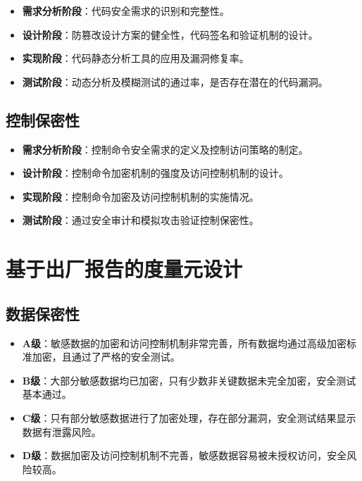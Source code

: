 \begin{itemize}
    \item \textbf{需求分析阶段}：代码安全需求的识别和完整性。\cite{chowdhury2008security}
    \item \textbf{设计阶段}：防篡改设计方案的健全性，代码签名和验证机制的设计。
    \item \textbf{实现阶段}：代码静态分析工具的应用及漏洞修复率。
    \item \textbf{测试阶段}：动态分析及模糊测试的通过率，是否存在潜在的代码漏洞。
\end{itemize}

\subsection{控制保密性}

\begin{itemize}
    \item \textbf{需求分析阶段}：控制命令安全需求的定义及控制访问策略的制定。
    \item \textbf{设计阶段}：控制命令加密机制的强度及访问控制机制的设计。
    \item \textbf{实现阶段}：控制命令加密及访问控制机制的实施情况。
    \item \textbf{测试阶段}：通过安全审计和模拟攻击验证控制保密性。
\end{itemize}

\section{基于出厂报告的度量元设计}

\subsection{数据保密性}

\begin{itemize}
    \item \textbf{A级}：敏感数据的加密和访问控制机制非常完善，所有数据均通过高级加密标准加密，且通过了严格的安全测试。
    \item \textbf{B级}：大部分敏感数据均已加密，只有少数非关键数据未完全加密，安全测试基本通过。
    \item \textbf{C级}：只有部分敏感数据进行了加密处理，存在部分漏洞，安全测试结果显示数据有泄露风险。
    \item \textbf{D级}：数据加密及访问控制机制不完善，敏感数据容易被未授权访问，安全风险较高。
\end{itemize}

